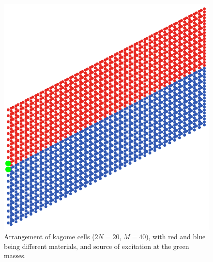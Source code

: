 \begin{figure}
  \centering
  \includegraphics[width=0.5\linewidth]{imgs/kagomestdarr.png}
  \caption{Arrangement of kagome cells ($2N=20$, $M=40$), with red and blue
    being different materials, and source of excitation at the green masses.}
  \label{fig:kagomestdfinlattice}
\end{figure}

